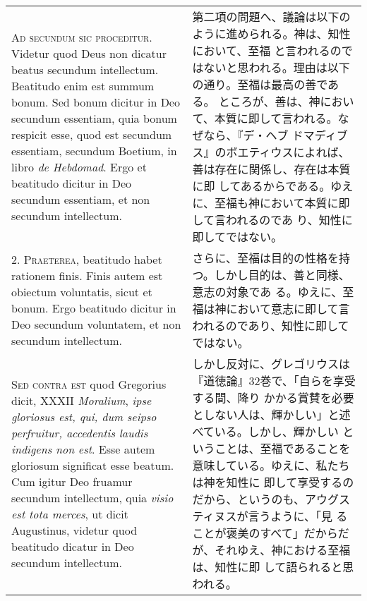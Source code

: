 \documentclass[10pt]{jsarticle} %
\begin{document}
\begin{longtable}{p{21em}p{21em}}


{\Huge A}{\scshape d secundum sic proceditur}. Videtur quod Deus non dicatur beatus
secundum intellectum. Beatitudo enim est summum bonum. Sed bonum dicitur
in Deo secundum essentiam, quia bonum respicit esse, quod est secundum
essentiam, secundum Boetium, in libro {\itshape de Hebdomad}. Ergo et beatitudo
dicitur in Deo secundum essentiam, et non secundum intellectum.


&

第二項の問題へ、議論は以下のように進められる。神は、知性において、至福
と言われるのではないと思われる。理由は以下の通り。至福は最高の善である。
ところが、善は、神において、本質に即して言われる。なぜなら、『デ・ヘブ
ドマディブス』のボエティウスによれば、善は存在に関係し、存在は本質に即
してあるからである。ゆえに、至福も神において本質に即して言われるのであ
り、知性に即してではない。

\\



2. {\scshape Praeterea}, beatitudo habet rationem finis. Finis autem est obiectum
voluntatis, sicut et bonum. Ergo beatitudo dicitur in Deo secundum
voluntatem, et non secundum intellectum.

&

さらに、至福は目的の性格を持つ。しかし目的は、善と同様、意志の対象であ
る。ゆえに、至福は神において意志に即して言われるのであり、知性に即して
ではない。

\\



{\scshape Sed contra est} quod Gregorius dicit, XXXII {\itshape
Moralium}, {\itshape ipse gloriosus est, qui, dum seipso perfruitur,
accedentis laudis indigens non est}. Esse autem gloriosum significat
esse beatum. Cum igitur Deo fruamur secundum intellectum, quia
{\itshape visio est tota merces}, ut dicit Augustinus, videtur quod
beatitudo dicatur in Deo secundum intellectum.

&

しかし反対に、グレゴリウスは『道徳論』32巻で、「自らを享受する間、降り
かかる賞賛を必要としない人は、輝かしい」と述べている。しかし、輝かしい
ということは、至福であることを意味している。ゆえに、私たちは神を知性に
即して享受するのだから、というのも、アウグスティヌスが言うように、「見
ることが褒美のすべて」だからだが、それゆえ、神における至福は、知性に即
して語られると思われる。



\end{longtable}
\end{document}
